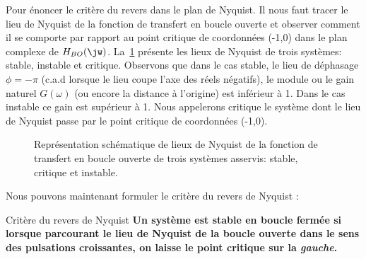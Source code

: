 Pour énoncer le critère du revers dans le plan de Nyquist. Il nous faut tracer
le lieu de Nyquist de la fonction de transfert en boucle ouverte et observer 
comment il se comporte par rapport au point critique de coordonnées (-1,0) 
dans le plan complexe de $H_{BO}(\jw)$. La~\cref{fig-nyquist_revers} présente 
les lieux de Nyquist de trois systèmes: stable, instable et critique. Observons
que dans le cas stable, le lieu de déphasage $\phi=-\pi$ (c.a.d lorsque le lieu
coupe l'axe des réels négatifs), le module ou le gain naturel $G(\omega)$ (ou 
encore la distance à l'origine) est inférieur à 1. Dans le cas instable ce gain 
est supérieur à 1. Nous appelerons critique le système dont le lieu de Nyquist 
passe par le point critique de coordonnées (-1,0).
\begin{figure}[!h]
    \centering
    
    \caption{Représentation schématique de lieux de Nyquist de la fonction 
             de transfert en boucle ouverte de trois systèmes asservis: 
             stable, critique et instable. \label{fig-nyquist_revers}}
\end{figure}
Nous pouvons maintenant formuler le critère du revers de Nyquist :
\begin{criteria}{Critère du revers de Nyquist}
\textbf{Un système est stable en boucle fermée si lorsque parcourant 
        le lieu de Nyquist de la boucle ouverte dans le sens des 
        pulsations croissantes, on laisse le point critique sur la 
        \emph{gauche}.}
\end{criteria}
\newpage
